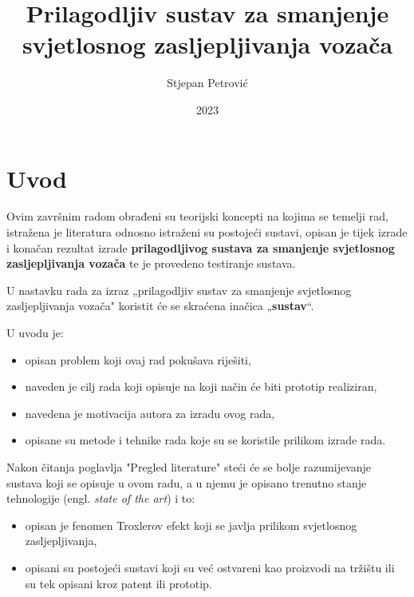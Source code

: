 \documentclass{foi}
\title{Prilagodljiv sustav za smanjenje svjetlosnog zasljepljivanja vozača}
\author{Stjepan Petrović}
\date{2023}
\begin{document}
\justifying



\maketitle

\tableofcontents

\pagestyle{plain}
\chapter{Uvod}

Ovim završnim radom obrađeni su teorijski koncepti na kojima se temelji rad, istražena je literatura odnosno istraženi su postojeći sustavi, opisan je tijek izrade i konačan rezultat izrade \textbf{prilagodljivog sustava za smanjenje svjetlosnog zasljepljivanja vozača} te je provedeno testiranje sustava.

U nastavku rada za izraz „prilagodljiv sustav za smanjenje svjetlosnog zasljepljivanja vozača" koristit će se skraćena inačica „\textbf{sustav}“.

\flushleft U uvodu je:
\justifying
\begin{itemize}[noitemsep]
    \item opisan problem koji ovaj rad pokušava riješiti,
    \item naveden je cilj rada koji opisuje na koji način će biti prototip realiziran,
    \item navedena je motivacija autora za izradu ovog rada,
    \item opisane su metode i tehnike rada koje su se koristile prilikom izrade rada.
\end{itemize}

\flushleft Nakon čitanja poglavlja "Pregled literature" steći će se bolje razumijevanje sustava koji se opisuje u ovom radu, a u njemu je opisano trenutno stanje tehnologije (engl. \emph{state of the art}) i to:
\justifying
\begin{itemize}[noitemsep]
    \item opisan je fenomen Troxlerov efekt koji se javlja prilikom svjetlosnog zasljepljivanja,
    \item opisani su postojeći sustavi koji su već ostvareni kao proizvodi na tržištu ili su tek opisani kroz patent ili prototip.
\end{itemize}
\end{document}
